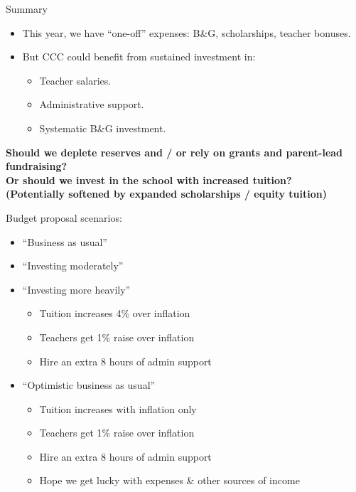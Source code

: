 \documentclass[8pt]{beamer}
\begin{document}
\begin{frame}{Summary}
\vspace{-0.5em}

%
\begin{itemize}
%
\item This year, we have ``one-off'' expenses: B\&G, scholarships, teacher bonuses.
\item But CCC could benefit from sustained investment in:
%
\begin{itemize}
%
\item Teacher salaries.
\item Administrative support.
\item Systematic B\&G investment.
%
\end{itemize}
%
\end{itemize}


\textbf{Should we deplete reserves and / or rely on grants and parent-lead fundraising?}\\
\vspace{0.5em}
\textbf{Or should we invest in the school with increased tuition?}\\
\textbf{(Potentially softened by expanded scholarships / equity tuition)}

Budget proposal scenarios:
\begin{itemize}
    \item ``Business as usual''
    \item ``Investing moderately''
    \item ``Investing more heavily''
        \begin{itemize}
        \item Tuition increases 4\% over inflation
        \item Teachers get 1\% raise over inflation
        \item Hire an extra 8 hours of admin support
        \end{itemize}
    \item ``Optimistic business as usual''
        \begin{itemize}
        \item Tuition increases with inflation only
        \item Teachers get 1\% raise over inflation
        \item Hire an extra 8 hours of admin support
        \item Hope we get lucky with expenses \& other sources of income
        \end{itemize}
\end{itemize}

%

\end{frame}
\end{document}
